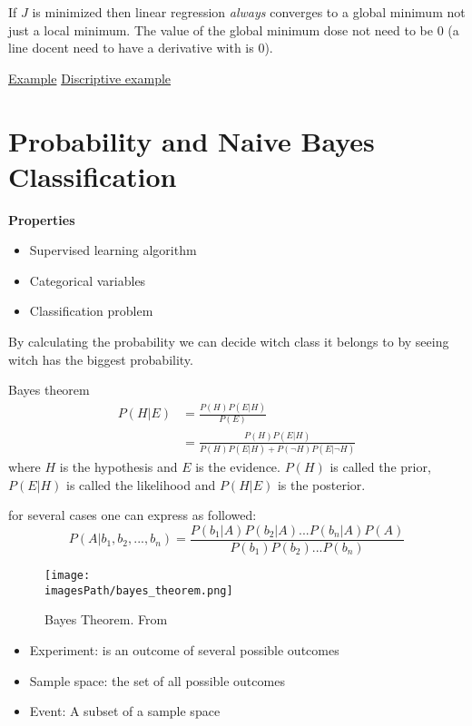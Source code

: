 \begin{multicols}{2}
If $J$ is minimized then linear regression \textit{always} converges to a global minimum not just a local minimum.
The value of the global minimum dose not need to be $0$ (a line docent need to have a derivative with is $0$).

\href{https://www.youtube.com/watch?v=ErpIw2ohNMs}{Example}
\href{https://machinelearningmastery.com/linear-regression-tutorial-using-gradient-descent-for-machine-learning/}{Discriptive example}


\section{Probability and Naive Bayes Classification}
\textbf{Properties}
\begin{itemize}
    \item Supervised learning algorithm
    \item Categorical variables 
    \item Classification problem
\end{itemize}

By calculating the probability we can decide witch class it belongs to by seeing witch 
has the biggest probability.

\begin{definitionblock}{Bayes theorem}
    \begin{align*}
        P(H|E) &= \frac{P(H)P(E|H)}{P(E)} \\
        &= \frac{P(H)P(E|H)}{P(H)P(E|H) + P(\neg H)P(E|\neg H)}
    \end{align*}
    where $H$ is the hypothesis and $E$ is the evidence. $P(H)$ is called the prior, $P(E|H)$ is called the likelihood
    and $P(H|E)$ is the posterior.

\end{definitionblock}

for several cases one can express as followed:
\begin{equation*}
    P(A|b_1,b_2,...,b_n) = \frac{P(b_1|A)P(b_2|A)...P(b_n|A)P(A)}{P(b_1)P(b_2)...P(b_n)}
\end{equation*}

\begin{figure}[H]
    \centering
    \texttt{[image: \\imagesPath/bayes\_theorem.png]}
    \caption{Bayes Theorem. From \cite{iml}}
\end{figure}

\begin{itemize}
    \item Experiment: is an outcome of several possible outcomes
    \item Sample space: the set of all possible outcomes
    \item Event: A subset of a sample space
\end{itemize}


\end{multicols}
